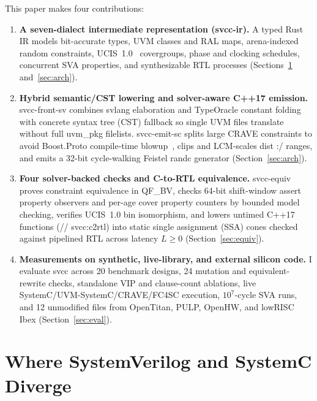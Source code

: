 \documentclass[conference]{IEEEtran}
\newcommand{\code}[1]{{\fontshape{n}\ttfamily #1}}
\begin{document}
This paper makes four contributions:
\begin{enumerate}
\item \textbf{A seven-dialect intermediate representation (\code{svcc-ir}).} A typed Rust IR models bit-accurate types, UVM classes and RAL maps, arena-indexed random constraints, UCIS~1.0~\cite{accellera_ucis10} covergroups, phase and clocking schedules, concurrent SVA properties, and synthesizable RTL processes (Sections~\ref{sec:impedance} and~\ref{sec:arch}).
\item \textbf{Hybrid semantic/CST lowering and solver-aware C++17 emission.} \code{svcc-front-sv} combines \code{svlang} elaboration and \code{TypeOracle} constant folding with concrete syntax tree (CST) fallback so single UVM files translate without full \code{uvm\_pkg} filelists. \code{svcc-emit-sc} splits large CRAVE constraints to avoid Boost.Proto compile-time blowup~\cite{veldhuizen1995expr}, clips and LCM-scales \code{dist} \code{:/} ranges, and emits a 32-bit cycle-walking Feistel \code{randc} generator (Section~\ref{sec:arch}).
\item \textbf{Four solver-backed checks and C-to-RTL equivalence.} \code{svcc-equiv} proves constraint equivalence in \code{QF\_BV}, checks 64-bit shift-window \code{assert property} observers and per-age \code{cover property} counters by bounded model checking, verifies UCIS~1.0 bin isomorphism, and lowers untimed C++17 functions (\code{// svcc:c2rtl}) into static single assignment (SSA) cones checked against pipelined RTL across latency $L \ge 0$ (Section~\ref{sec:equiv}).
\item \textbf{Measurements on synthetic, live-library, and external silicon code.} I evaluate \code{svcc} across 20 benchmark designs, 24 mutation and equivalent-rewrite checks, standalone VIP and clause-count ablations, live SystemC/UVM-SystemC/CRAVE/FC4SC execution, $10^7$-cycle SVA runs, and 12 unmodified files from OpenTitan, PULP, OpenHW, and lowRISC Ibex (Section~\ref{sec:eval}).
\end{enumerate}

\section{Where SystemVerilog and SystemC Diverge}
\label{sec:impedance}
\end{document}

